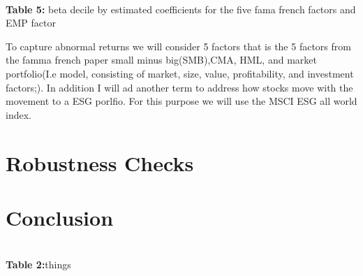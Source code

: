 \documentclass[12pt,oneside,reqno]{amsart}
\begin{document}
\begin{center}
\\
\textbf{Table 5:} beta decile by estimated coefficients for the  five fama french factors and EMP factor
\end{center}


To capture abnormal returns we will consider 5 factors that is the 5 factors from the famma french paper small minus big(SMB),CMA, HML, and market portfolio(I.e model, consisting of market, size, value, profitability, and investment factors;). In addition I will ad another term to address how stocks move with the movement to a ESG porlfio. For this purpose we will use the MSCI ESG all world index. 
\section{Robustness Checks}
\label{Robustness}

\section{Conclusion}
\label{Conclusion}

{}


\\


\vspace{1cm}
\textbf{Table 2:}things\\
\vspace{1cm}






\clearpage
\restoregeometry


%
\end{document}

